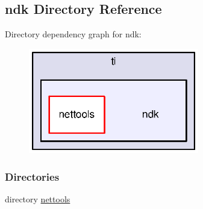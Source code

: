 \subsection{ndk Directory Reference}
\label{dir_4af44f8452c145eb95f06f7fdbc159e6}
Directory dependency graph for ndk\+:
\nopagebreak
\begin{figure}[H]
\begin{center}
\leavevmode
\includegraphics[width=211pt]{dir_4af44f8452c145eb95f06f7fdbc159e6_dep}
\end{center}
\end{figure}
\subsubsection*{Directories}
\begin{DoxyCompactItemize}
\item 
directory \hyperlink{dir_8aa605f920672f9d1f8eefe318f025c9}{nettools}
\end{DoxyCompactItemize}
